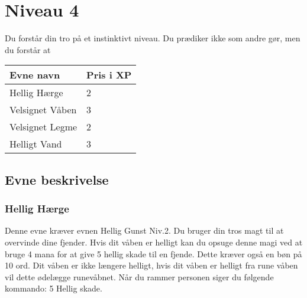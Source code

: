 \chapter{Niveau 4}
Du forstår din tro på et instinktivt niveau. Du prædiker ikke som andre gør, men du forstår at 


\begin{table}[H]
    \centering
    \begin{tabular}{|p{}|p{}|}
    \rowcolor{cerulean!80}\hline
        Evne navn & Pris i XP \\\hline
        Hellig Hærge & 2 \\\hline
        Velsignet Våben & 3 \\\hline
        Velsignet Legme & 2 \\\hline
        Helligt Vand & 3 \\\hline
    \end{tabular}
\end{table}
\section{Evne beskrivelse}

\subsection{Hellig Hærge}
Denne evne kræver evnen Hellig Gunst Niv.2. Du bruger din tros magt til at overvinde dine fjender. Hvis dit våben er helligt kan du opsuge denne magi ved at bruge 4 mana for at give 5 hellig skade til en fjende. Dette kræver også en bøn på 10 ord. Dit våben er ikke længere helligt, hvis dit våben er helligt fra rune våben vil dette ødelægge runevåbnet. Når du rammer personen siger du følgende kommando: 5 Hellig skade.

